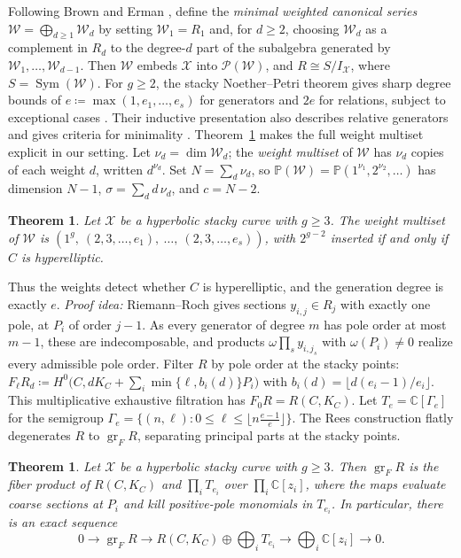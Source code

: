 \documentclass[11pt,reqno]{amsart}
\newtheorem{theorem}[lemma]{Theorem}
\theoremstyle{remark}
\newcommand{\Sym}{\operatorname{Sym}} %
\newcommand{\CC}{\mathbb{C}}
\newcommand{\PP}{\mathbb{P}}
\newcommand{\cP}{\mathcal{P}}
\newcommand{\cW}{\mathcal{W}}
\newcommand{\cX}{\mathcal{X}}
\begin{document}
Following Brown and Erman \cite[\S~3.1]{brownErman25}, define the \emph{minimal weighted canonical series} $\cW=\bigoplus_{d\geq1}\cW_d$ by setting $\cW_1=R_1$ and, for $d\geq2$, choosing $\cW_d$ as a complement in $R_d$ to the degree-$d$ part of the subalgebra generated by $\cW_1,\ldots,\cW_{d-1}$. Then $\cW$ embeds $\cX$ into $\cP(\cW)$, and $R\cong S/I_{\cX}$, where $S=\Sym(\cW)$. For $g\geq2$, the stacky Noether--Petri theorem gives sharp degree bounds of $e\coloneqq\max(1,e_1,\ldots,e_s)$ for generators and $2e$ for relations, subject to exceptional cases
\cite[Cor.~1.4.2]{voightZurieckBrown22}. Their inductive presentation also describes relative generators and gives criteria for minimality \cite[Thm.~8.3.1(a),(d)]{voightZurieckBrown22}. Theorem~\ref{conj:weights} makes the full weight multiset explicit in our setting. Let $\nu_d = \dim \cW_d$; the \emph{weight multiset} of $\cW$ has $\nu_d$ copies of each weight $d$, written $d^{\nu_d}$. Set $N = \sum_d \nu_d$, so $\PP(\cW)=\PP(1^{\nu_1},2^{\nu_2},\ldots)$ has dimension $N-1$, $\sigma = \sum_d d\,\nu_d$, and $c = N-2$.

\begin{theorem}\label{conj:weights}
Let $\cX$ be a hyperbolic stacky curve with $g\geq3$. The weight multiset of $\cW$ is $(1^{g},\ (2,3,\ldots,e_1),\ \ldots,\ (2,3,\ldots,e_s))$, with $2^{g-2}$ inserted if and only if $C$ is hyperelliptic.
\end{theorem}

Thus the weights detect whether $C$ is hyperelliptic, and the generation degree is exactly $e$. \emph{Proof idea:} Riemann--Roch gives sections $y_{i,j}\in R_j$ with exactly one pole, at $P_i$ of order $j-1$. As every generator of degree $m$ has pole order at most $m-1$, these are indecomposable, and products $\omega\prod_sy_{i,j_s}$ with $\omega(P_i)\ne0$ realize every admissible pole order. Filter $R$ by pole order at the stacky points: $F_{\ell}R_d \coloneqq H^0\big(C,dK_C+\sum_i\min\{\ell,b_i(d)\}P_i\big)$ with $b_i(d)=\lfloor d(e_i-1)/e_i\rfloor$. This multiplicative exhaustive filtration has $F_{0}R = R(C, K_C)$. Let $T_e = \CC[\Gamma_e]$ for the semigroup $\Gamma_e=\{(n,\ell):0\leq\ell\leq\lfloor n\tfrac{e-1}{e}\rfloor\}$. The Rees construction flatly degenerates $R$ to $\operatorname{gr}_F R$, separating principal parts at the stacky points.

\begin{theorem}\label{conj:degeneration}
Let $\cX$ be a hyperbolic stacky curve with $g\geq3$. Then $\operatorname{gr}_F R$ is the fiber product of $R(C,K_C)$ and $\prod_iT_{e_i}$ over $\prod_i\CC[z_i]$, where the maps evaluate coarse sections at $P_i$ and kill positive-pole monomials in $T_{e_i}$. In particular, there is an exact sequence
\begin{equation}\label{eq:fiber}
0\longrightarrow\operatorname{gr}_F R
\longrightarrow R(C,K_C)\oplus\bigoplus_iT_{e_i}
\longrightarrow\bigoplus_i\CC[z_i]
\longrightarrow0.
\end{equation}
\end{theorem}
\end{document}
